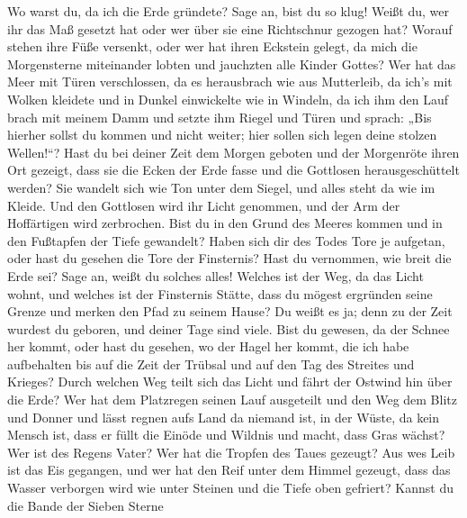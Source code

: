  Wo warst du, da ich die Erde gründete? Sage an, bist du
so klug!  Weißt du, wer ihr das Maß gesetzt hat oder wer
über sie eine Richtschnur gezogen hat?  Worauf stehen ihre
Füße versenkt, oder wer hat ihren Eckstein gelegt,  da
mich die Morgensterne miteinander lobten und jauchzten alle Kinder
Gottes?  Wer hat das Meer mit Türen verschlossen, da es
herausbrach wie aus Mutterleib,  da ich's mit Wolken
kleidete und in Dunkel einwickelte wie in Windeln,  da
ich ihm den Lauf brach mit meinem Damm und setzte ihm Riegel und Türen
 und sprach: „Bis hierher sollst du kommen und nicht
weiter; hier sollen sich legen deine stolzen Wellen!{}``?
 Hast du bei deiner Zeit dem Morgen geboten und der
Morgenröte ihren Ort gezeigt,  dass sie die Ecken der
Erde fasse und die Gottlosen herausgeschüttelt werden? 
Sie wandelt sich wie Ton unter dem Siegel, und alles steht da wie im
Kleide.  Und den Gottlosen wird ihr Licht genommen, und
der Arm der Hoffärtigen wird zerbrochen.  Bist du in den
Grund des Meeres kommen und in den Fußtapfen der Tiefe gewandelt?
 Haben sich dir des Todes Tore je aufgetan, oder hast du
gesehen die Tore der Finsternis?  Hast du vernommen, wie
breit die Erde sei? Sage an, weißt du solches alles! 
Welches ist der Weg, da das Licht wohnt, und welches ist der Finsternis
Stätte,  dass du mögest ergründen seine Grenze und merken
den Pfad zu seinem Hause?  Du weißt es ja; denn zu der
Zeit wurdest du geboren, und deiner Tage sind viele. 
Bist du gewesen, da der Schnee her kommt, oder hast du gesehen, wo der
Hagel her kommt,  die ich habe aufbehalten bis auf die
Zeit der Trübsal und auf den Tag des Streites und Krieges?
 Durch welchen Weg teilt sich das Licht und fährt der
Ostwind hin über die Erde?  Wer hat dem Platzregen seinen
Lauf ausgeteilt und den Weg dem Blitz und Donner  und
lässt regnen aufs Land da niemand ist, in der Wüste, da kein Mensch ist,
 dass er füllt die Einöde und Wildnis und macht, dass
Gras wächst?  Wer ist des Regens Vater? Wer hat die
Tropfen des Taues gezeugt?  Aus wes Leib ist das Eis
gegangen, und wer hat den Reif unter dem Himmel gezeugt, 
dass das Wasser verborgen wird wie unter Steinen und die Tiefe oben
gefriert?  Kannst du die Bande der Sieben Sterne
